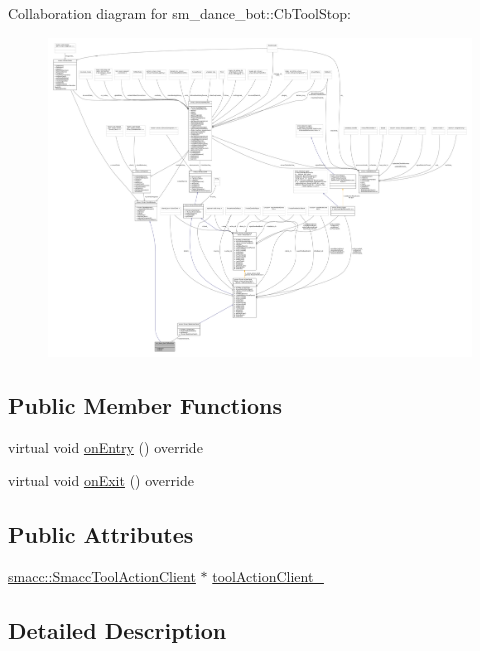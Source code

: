 Collaboration diagram for sm\+\_\+dance\+\_\+bot\+:\+:Cb\+Tool\+Stop\+:
\nopagebreak
\begin{figure}[H]
\begin{center}
\leavevmode
\includegraphics[width=350pt]{classsm__dance__bot_1_1CbToolStop__coll__graph}
\end{center}
\end{figure}
\subsection*{Public Member Functions}
\begin{DoxyCompactItemize}
\item 
virtual void \hyperlink{classsm__dance__bot_1_1CbToolStop_a453bebcefc3f8217bfe37f85a29ecf25}{on\+Entry} () override
\item 
virtual void \hyperlink{classsm__dance__bot_1_1CbToolStop_a84f13b3392558cdabd7a141445b0fa02}{on\+Exit} () override
\end{DoxyCompactItemize}
\subsection*{Public Attributes}
\begin{DoxyCompactItemize}
\item 
\hyperlink{classsmacc_1_1SmaccToolActionClient}{smacc\+::\+Smacc\+Tool\+Action\+Client} $\ast$ \hyperlink{classsm__dance__bot_1_1CbToolStop_aa8d9400ae702c970f970980e5d7a13c5}{tool\+Action\+Client\+\_\+}
\end{DoxyCompactItemize}


\subsection{Detailed Description}


